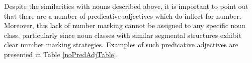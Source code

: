 
Despite the similarities with nouns described above, it is important to point out that there are a number of predicative adjectives which do  inflect for number. Moreover, this lack of number marking cannot be assigned to any specific noun class, %
particularly since noun classes with similar segmental structures exhibit clear number marking strategies. Examples of such predicative adjectives are presented in Table \vref{noPredAdjTable}. 

